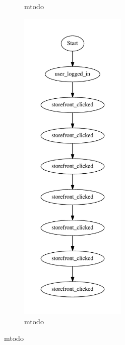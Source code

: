 \begin{figure}[H]
\begin{subfigure}{.33\textwidth}
            \centering
            \caption{mtodo}
    \label{subfigure:statesInteractions}
        \end{subfigure}%
        \begin{subfigure}{.33\textwidth}
            \includegraphics[width=2in]{image/56session-17-gvfile.pdf}
            \centering
            \caption{mtodo}
    \label{subfigure:statesInteractions}
        \end{subfigure}
    \end{figure}





